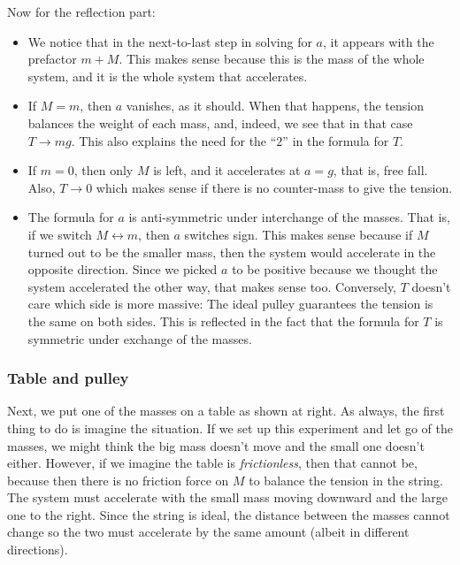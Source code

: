 Now for the reflection part: 
\begin{itemize}
\item We notice that in the next-to-last step in solving for $a$, it appears with the prefactor $m+M$. This makes sense because this is the mass of the whole system, and it is the whole system that accelerates.
\item If $M=m$, then $a$ vanishes, as it should. When that happens, the tension balances the weight of each mass, and, indeed, we see that in that case $T→ mg$. This also explains the need for the “$2$” in the formula for $T$.
\item If $m=0$, then only $M$ is left, and it accelerates at $a=g$, that is, free fall. Also, $T→ 0$ which makes sense if there is no counter-mass to give the tension. 
\item The formula for $a$ is anti-symmetric under interchange of the masses. That is, if we switch $M \leftrightarrow m$, then $a$ switches sign. This makes sense because if $M$ turned out to be the smaller mass, then the system would accelerate in the opposite direction. Since we picked $a$ to be positive because we thought the system accelerated the other way, that makes sense too. Conversely, $T$ doesn't care which side is more massive: The ideal pulley guarantees the tension is the same on both sides. This is reflected in the fact that the formula for $T$ is symmetric under exchange of the masses. 
\end{itemize}


\subsubsection{Table and pulley}

Next, we put one of the masses on a table as shown at right. 
As always, the first thing to do is imagine the situation. If we set up this experiment and let go of the masses, we might think the big mass doesn't move and the small one doesn't either. However, if we imagine the table is {\em frictionless}, then that cannot be, because then there is no friction force on $M$ to balance the tension in the string. The system must accelerate with the small mass moving downward and the large one to the right. Since the string is ideal, the distance between the masses cannot change so the two must accelerate by the same amount (albeit in different directions). 


